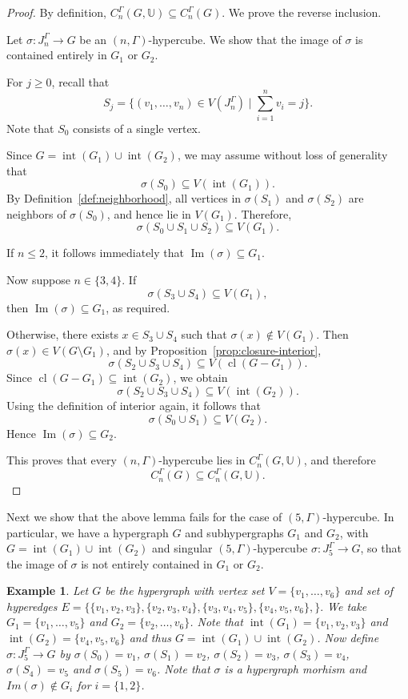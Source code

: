 \documentclass[10pt,a4paper]{amsart}
\newtheorem{ex}[subsection]{Example}
\newcommand{\cl}{\operatorname{cl}}
\renewcommand{\int}{\operatorname{int}}
\begin{document}
\begin{proof}
By definition, $C_n^\Gamma(G,\mathbb{U}) \subseteq C_n^\Gamma(G)$. We prove the reverse inclusion.

Let $\sigma : J_n^\Gamma \to G$ be an $(n,\Gamma)$-hypercube. We show that the image of $\sigma$ is contained entirely in $G_1$ or $G_2$.

For $j \ge 0$, recall that
\[
S_j = \{(v_1,\dots,v_n) \in V(J_n^\Gamma) \mid \textstyle\sum_{i=1}^n v_i = j\}.
\]
Note that $S_0$ consists of a single vertex.

Since $G = \int(G_1) \cup \int(G_2)$, we may assume without loss of generality that
\[
\sigma(S_0) \subseteq V(\int(G_1)).
\]
By Definition~\ref{def:neighborhood}, all vertices in $\sigma(S_1)$ and $\sigma(S_2)$ are neighbors of $\sigma(S_0)$, and hence lie in $V(G_1)$. Therefore,
\[
\sigma(S_0 \cup S_1 \cup S_2) \subseteq V(G_1).
\]

If $n \le 2$, it follows immediately that $\operatorname{Im}(\sigma) \subseteq G_1$.

Now suppose $n \in \{3,4\}$. If
\[
\sigma(S_3 \cup S_4) \subseteq V(G_1),
\]
then $\operatorname{Im}(\sigma) \subseteq G_1$, as required.

Otherwise, there exists $x \in S_3 \cup S_4$ such that $\sigma(x) \notin V(G_1)$. Then $\sigma(x) \in V(G \setminus G_1)$, and by Proposition~\ref{prop:closure-interior},
\[
\sigma(S_2 \cup S_3 \cup S_4) \subseteq V(\cl(G - G_1)).
\]
Since $\cl(G - G_1) \subseteq \int(G_2)$, we obtain
\[
\sigma(S_2 \cup S_3 \cup S_4) \subseteq V(\int(G_2)).
\]
Using the definition of interior again, it follows that
\[
\sigma(S_0 \cup S_1) \subseteq V(G_2).
\]
Hence $\operatorname{Im}(\sigma) \subseteq G_2$.

This proves that every $(n,\Gamma)$-hypercube lies in $C_n^\Gamma(G,\mathbb{U})$, and therefore
\[
C_n^\Gamma(G) \subseteq C_n^\Gamma(G,\mathbb{U}).
\]
\end{proof}

Next we show that the above lemma fails for the case of  $(5,\Gamma)$-hypercube. In particular, we have a hypergraph $G$ and subhypergraphs $G_1$ and $G_2$, 
with $G=\int(G_1)\cup \int(G_2)$ and singular $(5,\Gamma)$-hypercube $\sigma:J_5^\Gamma\to G$, so that the image of $\sigma$ is not entirely contained in $G_1$ or $G_2$.
\begin{ex}
	
	Let $G$ be the hypergraph with vertex set $V=\{v_1,\ldots, v_{6}\}$ and set of hyperedges $E=\{\{v_1,v_2,v_3\}, \{v_2, v_3,v_4\},\{v_3,v_4,v_5\}, \{v_4,v_5,v_6\},\}.$ We take $G_1=\{v_1,\ldots, v_5\}$ and $G_2=\{v_2,\ldots, v_{6}\}$. Note that $\int(G_1)=\{v_1,v_2,v_3\}$ and $\int(G_2)=\{v_4,v_5,v_{6}\}$ and thus $G=\int(G_1)\cup \int(G_2)$. Now define $\sigma: J_5^\Gamma\rightarrow G$ by $\sigma(S_0)=v_1$, $\sigma(S_1)=v_2$, $\sigma(S_2)=v_3$, $\sigma(S_3)=v_4$, $\sigma(S_4)=v_5$ and $\sigma(S_5)=v_{6}$. Note that $\sigma $ is a hypergraph morhism and $Im(\sigma) \notin G_i$ for $i=\{1,2\}$. 
\end{ex}
\end{document}

